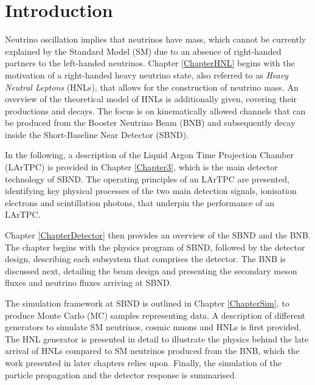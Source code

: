 
\chapter{Introduction}  %

Neutrino oscillation implies that neutrinos have mass, which cannot be currently explained by the Standard Model (SM) due to an absence of right-handed partners to the left-handed neutrinos.  
Chapter \ref{ChapterHNL}  begins with the motivation of a right-handed heavy neutrino state, also referred to as \textit{Heavy Neutral Leptons} (HNLs), that allows for the construction of neutrino mass.
An overview of the theoretical model of HNLs is additionally given, covering their productions and decays.
The focus is on kinematically allowed channels that can be produced from the Booster Neutrino Beam (BNB) and subsequently decay inside the Short-Baseline Near Detector (SBND).

In the following, a description of the Liquid Argon Time Projection Chamber (LArTPC) is provided in Chapter \ref{Chapter3}, which is the main detector technology of SBND.
The operating principles of an LArTPC are presented, identifying key physical processes of the two main detection signals, ionisation electrons and scintillation photons, that underpin the performance of an LArTPC.

Chapter \ref{ChapterDetector} then provides an overview of the SBND and the BNB.
The chapter begins with the physics program of SBND, followed by the detector design, describing each subsystem that comprises the detector.
The BNB is discussed next, detailing the beam design and presenting the secondary meson fluxes and neutrino fluxes arriving at SBND.

The simulation framework at SBND is outlined in Chapter \ref{ChapterSim}, to produce Monte Carlo (MC) samples representing data.
A description of different generators to simulate SM neutrinos, cosmic muons and HNLs is first provided.
The HNL generator is presented in detail to illustrate the physics behind the late arrival of HNLs compared to SM neutrinos produced from the BNB, which the work presented in later chapters relies upon.  
Finally, the simulation of the particle propagation and the detector response is summarised.

